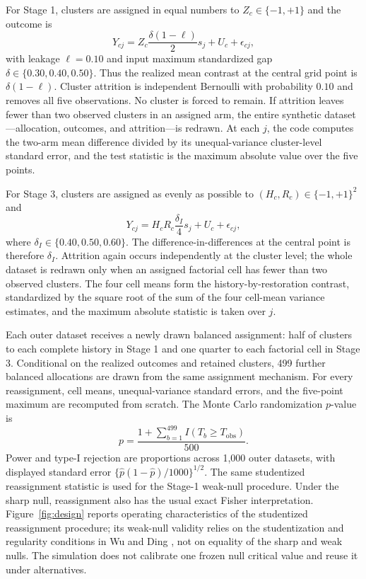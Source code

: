 \documentclass[10pt,a4paper]{article}
\begin{document}
\begin{appendices}
For Stage 1, clusters are assigned in equal numbers to $Z_c\in\{-1,+1\}$ and the outcome is
\begin{equation}
Y_{cj}=Z_c\frac{\delta(1-\ell)}{2}s_j+U_c+\epsilon_{cj},
\label{eq:power-history-dgp}
\end{equation}
with leakage $\ell=0.10$ and input maximum standardized gap $\delta\in\{0.30,0.40,0.50\}$. Thus the realized mean contrast at the central grid point is $\delta(1-\ell)$. Cluster attrition is independent Bernoulli with probability $0.10$ and removes all five observations. No cluster is forced to remain. If attrition leaves fewer than two observed clusters in an assigned arm, the entire synthetic dataset---allocation, outcomes, and attrition---is redrawn. At each $j$, the code computes the two-arm mean difference divided by its unequal-variance cluster-level standard error, and the test statistic is the maximum absolute value over the five points.

For Stage 3, clusters are assigned as evenly as possible to $(H_c,R_c)\in\{-1,+1\}^2$ and
\begin{equation}
Y_{cj}=H_cR_c\frac{\delta_I}{4}s_j+U_c+\epsilon_{cj},
\label{eq:power-reset-dgp}
\end{equation}
where $\delta_I\in\{0.40,0.50,0.60\}$. The difference-in-differences at the central point is therefore $\delta_I$. Attrition again occurs independently at the cluster level; the whole dataset is redrawn only when an assigned factorial cell has fewer than two observed clusters. The four cell means form the history-by-restoration contrast, standardized by the square root of the sum of the four cell-mean variance estimates, and the maximum absolute statistic is taken over $j$.

Each outer dataset receives a newly drawn balanced assignment: half of clusters to each complete history in Stage 1 and one quarter to each factorial cell in Stage 3. Conditional on the realized outcomes and retained clusters, 499 further balanced allocations are drawn from the same assignment mechanism. For every reassignment, cell means, unequal-variance standard errors, and the five-point maximum are recomputed from scratch. The Monte Carlo randomization $p$-value is
\begin{equation}
p=\frac{1+\sum_{b=1}^{499}I(T_b\geq T_{\mathrm{obs}})}{500}.
\end{equation}
Power and type-I rejection are proportions across 1,000 outer datasets, with displayed standard error $\{\widehat p(1-\widehat p)/1000\}^{1/2}$. The same studentized reassignment statistic is used for the Stage-1 weak-null procedure. Under the sharp null, reassignment also has the usual exact Fisher interpretation. Figure~\ref{fig:design} reports operating characteristics of the studentized reassignment procedure; its weak-null validity relies on the studentization and regularity conditions in Wu and Ding \cite{wu2021randomization}, not on equality of the sharp and weak nulls. The simulation does not calibrate one frozen null critical value and reuse it under alternatives.


\end{appendices}
\end{document}
